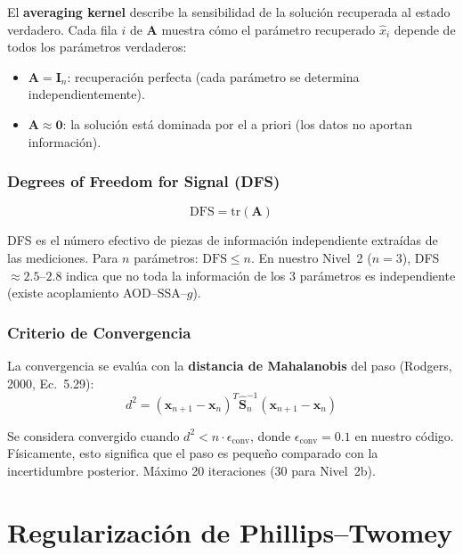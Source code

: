 \documentclass[a4paper,11pt]{article}
\begin{document}
El \textbf{averaging kernel} describe la sensibilidad de la soluci\'on
recuperada al estado verdadero.  Cada fila $i$ de $\mathbf{A}$ muestra c\'omo
el par\'ametro recuperado $\hat{x}_i$ depende de todos los par\'ametros
verdaderos:
\begin{itemize}
    \item $\mathbf{A} = \mathbf{I}_n$: recuperaci\'on perfecta (cada par\'ametro
          se determina independientemente).
    \item $\mathbf{A} \approx \mathbf{0}$: la soluci\'on est\'a dominada por
          el a priori (los datos no aportan informaci\'on).
\end{itemize}

\subsubsection{Degrees of Freedom for Signal (DFS)}

\begin{equation}
    \text{DFS} = \text{tr}(\mathbf{A})
\end{equation}

DFS es el n\'umero efectivo de piezas de informaci\'on independiente
extra\'idas de las mediciones.  Para $n$ par\'ametros:
$\text{DFS} \leq n$.  En nuestro Nivel~2 ($n=3$), DFS $\approx 2.5$--$2.8$
indica que no toda la informaci\'on de los 3 par\'ametros es independiente
(existe acoplamiento AOD--SSA--$g$).

\subsubsection{Criterio de Convergencia}

La convergencia se eval\'ua con la \textbf{distancia de Mahalanobis}
del paso (Rodgers, 2000, Ec.~5.29):
\begin{equation}
    d^2 = (\mathbf{x}_{n+1}-\mathbf{x}_n)^T\hat{\mathbf{S}}_n^{-1}
    (\mathbf{x}_{n+1}-\mathbf{x}_n)
\end{equation}

Se considera convergido cuando $d^2 < n \cdot \epsilon_{\text{conv}}$, donde
$\epsilon_{\text{conv}} = 0.1$ en nuestro c\'odigo.  F\'isicamente, esto
significa que el paso es peque\~no comparado con la incertidumbre posterior.
M\'aximo 20 iteraciones (30 para Nivel~2b).


\section{Regularizaci\'on de Phillips--Twomey}\label{sec:pt}
\end{document}
